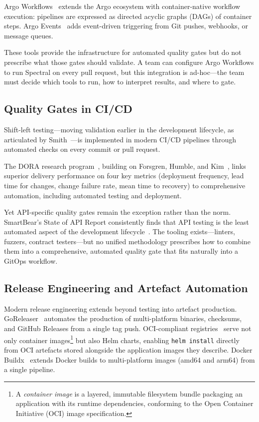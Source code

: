 Argo Workflows~\cite{argo-workflows} extends the Argo ecosystem with container-native workflow execution: pipelines are expressed as directed acyclic graphs (DAGs) of container steps. Argo Events~\cite{argo-events} adds event-driven triggering from Git pushes, webhooks, or message queues.

These tools provide the infrastructure for automated quality gates but do not prescribe what those gates should validate. A team can configure Argo Workflows to run Spectral on every pull request, but this integration is ad-hoc---the team must decide which tools to run, how to interpret results, and where to gate.

\subsection{Quality Gates in CI/CD}
\label{subsec:quality-gates}

Shift-left testing---moving validation earlier in the development lifecycle, as articulated by Smith~\cite{shift-left}---is implemented in modern CI/CD pipelines through automated checks on every commit or pull request.

The DORA research program~\cite{dora-metrics}, building on Forsgren, Humble, and Kim~\cite{accelerate}, links superior delivery performance on four key metrics (deployment frequency, lead time for changes, change failure rate, mean time to recovery) to comprehensive automation, including automated testing and deployment.

Yet API-specific quality gates remain the exception rather than the norm. SmartBear's State of API Report consistently finds that API testing is the least automated aspect of the development lifecycle~\cite{smartbear-api-report}. The tooling exists---linters, fuzzers, contract testers---but no unified methodology prescribes how to combine them into a comprehensive, automated quality gate that fits naturally into a GitOps workflow.

\subsection{Release Engineering and Artefact Automation}
\label{subsec:release-engineering}

Modern release engineering extends beyond testing into artefact production. GoReleaser~\cite{goreleaser} automates the production of multi-platform binaries, checksums, and GitHub Releases from a single tag push. OCI-compliant registries~\cite{helm-oci} serve not only container images\footnote{A \emph{container image} is a layered, immutable filesystem bundle packaging an application with its runtime dependencies, conforming to the Open Container Initiative (OCI) image specification.} but also Helm charts, enabling \texttt{helm install} directly from OCI artefacts stored alongside the application images they describe. Docker Buildx~\cite{docker-buildx} extends Docker builds to multi-platform images (amd64 and arm64) from a single pipeline.


